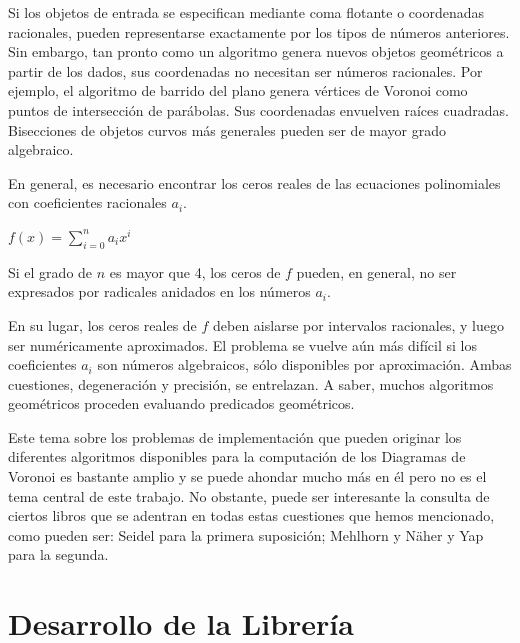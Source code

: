 \begin{enumerate}
        Si los objetos de entrada se especifican mediante coma flotante o coordenadas racionales, pueden representarse exactamente por los tipos de números anteriores. Sin embargo, tan pronto como un algoritmo genera nuevos objetos geométricos a partir de los dados, sus coordenadas no necesitan ser números racionales. Por ejemplo, el algoritmo de barrido del plano genera vértices de Voronoi como puntos de intersección de parábolas. Sus coordenadas envuelven raíces cuadradas. Bisecciones de objetos curvos más generales pueden ser de mayor grado algebraico.
        
        
        En general, es necesario encontrar los ceros reales de las ecuaciones polinomiales con coeficientes racionales $a_{i}$.
        
        \begin{center} $f(x) =  \displaystyle\sum_{i=0}^n a_{i}x^i$ \end{center}
        
        Si el grado de $n$ es mayor que 4, los ceros de $f$ pueden, en general, no ser expresados por radicales anidados en los números $a_{i}$. 
        
        En su lugar, los ceros reales de $f$ deben aislarse por intervalos racionales, y luego ser numéricamente aproximados. El problema se vuelve aún más difícil si los coeficientes $a_{i}$ son números algebraicos, sólo disponibles por aproximación. Ambas cuestiones, degeneración y precisión, se entrelazan. A saber, muchos algoritmos geométricos proceden evaluando predicados geométricos. 
        

\end{enumerate}
Este tema sobre los problemas de implementación que pueden originar los diferentes algoritmos disponibles para la computación de los Diagramas de Voronoi es bastante amplio y se puede ahondar mucho más en él pero no es el tema central de este trabajo. No obstante, puede ser interesante la consulta de ciertos libros que se adentran en todas estas cuestiones que hemos mencionado, como pueden ser: Seidel \cite{seidel} para la primera suposición;  Mehlhorn y Näher \cite{mys} y Yap \cite{yap} para la segunda.

\vspace{0.3cm}


\chapter{Desarrollo de la Librería} \label{capi6}

